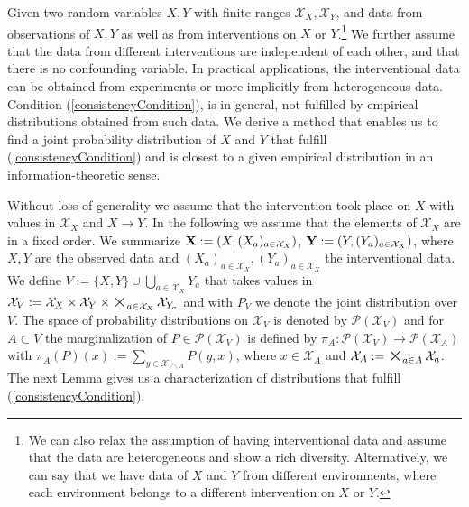 \documentclass[letterpaper]{article}
\newcommand{\kP}{\mathcal{P}}   %
\newcommand{\kX}{\mathcal{X}}   %
\newcommand{\BIGOP}[1]{\mathop{\mathchoice%
{\raise-0.22em\hbox{\huge $#1$}}%
{\raise-0.05em\hbox{\Large $#1$}}{\hbox{\large $#1$}}{#1}}}
\newcommand{\bigtimes}{\BIGOP{\times}}
\begin{document}
Given two random variables $X, Y$ with finite ranges $\kX_X, \kX_Y$, and data from observations of $X, Y$ as well as from interventions on $X$ or $Y$.\footnote{We can also relax the assumption of having interventional data and assume that the data are heterogeneous and show a rich diversity. Alternatively, we can say that we have data of $X$ and $Y$ from different environments, where each environment belongs to a different intervention on $X$ or $Y$.} We further assume that the data from different interventions are independent of each other, and that there is no confounding variable. In practical applications, the interventional data can be obtained from experiments or more implicitly from heterogeneous data. Condition (\ref{consistencyCondition}), is in general, not fulfilled by empirical distributions obtained from such data. We derive a method that enables us to find a joint probability distribution of $X$ and $Y$ that fulfill (\ref{consistencyCondition}) and is closest to a given empirical distribution in an information-theoretic sense.

Without loss of generality we assume that the intervention took place on $X$ with values in $\kX_X$ and $X\rightarrow Y$. In the following we assume that the elements of $\kX_X$ are in a fixed order. We summarize ${\bf X}:= (X, (X_a)_{a \in \kX_X})$, ${\bf Y}:=(Y,(Y_a)_{a \in \kX_X})$, where $X,Y$ are the observed data and $(X_a)_{a \in \kX_X}, (Y_a)_{a \in \kX_X}$ the interventional data. We define $V:=\{X, Y\} \cup \bigcup_{a\in \kX_X} Y_{a}$ that takes values in $\kX_V:=\kX_X \times \kX_Y \times \bigtimes_{a \in \kX_X} \kX_{Y_{a}}$ and with $P_{V}$ we denote the joint distribution over $V$. The space of probability distributions on $\kX_V$ is denoted by $\kP(\kX_V)$ and for $A \subset V$ the marginalization of $P \in \kP(\kX_V)$ is defined by $\pi_A : \kP(\kX_V) \rightarrow \kP(\kX_A)$ with $\pi_A(P)(x):= \sum_{y\in \kX_{V \backslash A}} P(y,x)$, where $x\in \kX_A$ and $\kX_A := \bigtimes_{a \in A} \kX_a$. The next Lemma gives us a characterization of distributions that fulfill (\ref{consistencyCondition}).
\end{document}
